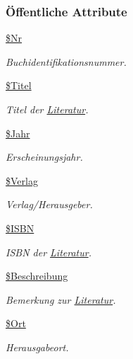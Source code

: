 \subsubsection*{\"{O}ffentliche Attribute}
\begin{CompactItemize}
\item 
\hyperlink{classLiteratur_036a682a93a5d50839c1ebc70a79d4b6}{\$Nr}
\begin{CompactList}\small\item\em Buchidentifikationsnummer. \item\end{CompactList}\item 
\hyperlink{classLiteratur_e30f9e9db9b396e6f87adfdb94e12ba0}{\$Titel}
\begin{CompactList}\small\item\em Titel der \hyperlink{classLiteratur}{Literatur}. \item\end{CompactList}\item 
\hyperlink{classLiteratur_2cb6f40a8757a0edd5da32385ad009c9}{\$Jahr}
\begin{CompactList}\small\item\em Erscheinungsjahr. \item\end{CompactList}\item 
\hyperlink{classLiteratur_5f591208e5d21bb81e6c51484e2a60e0}{\$Verlag}
\begin{CompactList}\small\item\em Verlag/Herausgeber. \item\end{CompactList}\item 
\hyperlink{classLiteratur_9e3b00766297a68adac423980767dd3c}{\$ISBN}
\begin{CompactList}\small\item\em ISBN der \hyperlink{classLiteratur}{Literatur}. \item\end{CompactList}\item 
\hyperlink{classLiteratur_6769ff8b353d2f789125f009b4dcfdc0}{\$Beschreibung}
\begin{CompactList}\small\item\em Bemerkung zur \hyperlink{classLiteratur}{Literatur}. \item\end{CompactList}\item 
\hyperlink{classLiteratur_da6c458bb229187efea8e8f144a1d279}{\$Ort}
\begin{CompactList}\small\item\em Herausgabeort. \item\end{CompactList}\item 

\end{CompactItemize}
